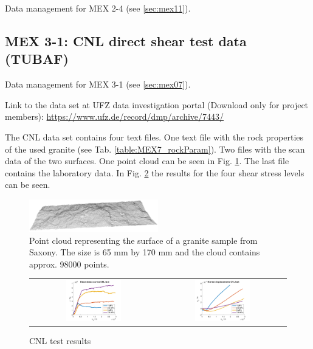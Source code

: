 Data management for MEX 2-4 (see \ref{sec:mex11}).

\subsection{MEX 3-1: CNL direct shear test data (TUBAF)}\label{DataManMex3-1CNL}

Data management for MEX 3-1 (see \ref{sec:mex07}).

Link to the data set at UFZ data investigation portal (Download only for project members):
\url{https://www.ufz.de/record/dmp/archive/7443/}

The CNL data set contains four text files. One text file with the rock properties of the used granite (see Tab. \ref{table:MEX7_rockParam}). Two files with the scan data of the two surfaces. One point cloud can be seen in Fig. \ref{fig:DataCNLGranitePointCloud}. The last file contains the laboratory data. In Fig. \ref{fig:DataCNLGraniteLab} the results for the four shear stress levels can be seen.

\begin{figure}[!ht]
\begin{center}
\includegraphics[width=0.5\textwidth]{./figures/MEX7_Point_cloud.png}
\end{center}
\caption{Point cloud representing the surface of a granite sample from Saxony. The size is 65 mm by 170 mm and the cloud contains approx. 98000 points.}
\label{fig:DataCNLGranitePointCloud}
\end{figure}

\begin{figure}[!ht]
\begin{tabular}{cc}
\includegraphics[width=0.45\textwidth]{./figures/CNLShearCurvesAll.png}     
& 
\includegraphics[width=0.45\textwidth]{./figures/CNLDilatationAll.png} 
\end{tabular}
\caption{CNL test results}
\label{fig:DataCNLGraniteLab}
\end{figure}

